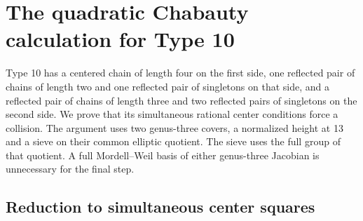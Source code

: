 \section{The quadratic Chabauty calculation for Type 10}\label{app:type10}

Type 10 has a centered chain of length four on the first side, one
reflected pair of chains of length two and one reflected pair of
singletons on that side, and a reflected pair of chains of length three
and two reflected pairs of singletons on the second side. We prove that
its simultaneous rational center conditions force a collision. The
argument uses two genus-three covers, a normalized height at 13 and a
sieve on their common elliptic quotient. The sieve uses the full group
of that quotient. A full Mordell--Weil basis of either genus-three
Jacobian is unnecessary for the final step.

\subsection{Reduction to simultaneous center squares}

